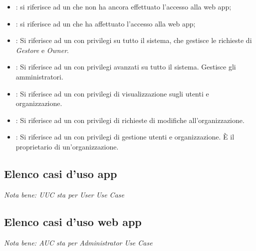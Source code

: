 \documentclass[../analisi-dei-requisiti]{subfiles}
\begin{document}
\begin{itemize}
  \item \textbf{}: si riferisce ad un  che non ha ancora effettuato l'accesso alla web app;
  \item \textbf{}: si riferisce ad un  che ha affettuato l'accesso alla web app;
  \item \textbf{}: Si riferisce ad un  con privilegi su tutto il sistema, che gestisce le richieste di \emph{Gestore} e \emph{Owner}.
  \item \textbf{}: Si riferisce ad un  con privilegi avanzati su tutto il sistema. Gestisce gli amministratori.
  \item \textbf{}: Si riferisce ad un  con privilegi di visualizzazione sugli utenti e organizzazione.
  \item \textbf{}: Si riferisce ad un  con privilegi di richieste di modifiche all'organizzazione.
  \item \textbf{}: Si riferisce ad un  con privilegi di gestione utenti e organizzazione. È il proprietario di un'organizzazione.
\end{itemize}


\subsection{Elenco casi d'uso app}%
\label{sub:casi_duso_app}
\emph{Nota bene: UUC sta per User Use Case}

\subsection{Elenco casi d'uso web app}%
\label{sub:casi_duso_web_app}
\emph{Nota bene: AUC sta per Administrator Use Case}

\end{document}
